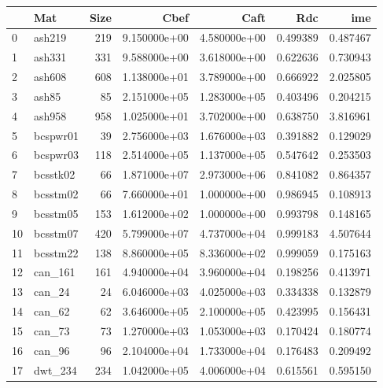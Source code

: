 \begin{tabular}{llrrrrr}
\toprule
{} &                 Mat &  Size &          Cbef &          Caft &       Rdc &        ime \\
\midrule
0  &              ash219 &   219 &  9.150000e+00 &  4.580000e+00 &  0.499389 &   0.487467 \\
1  &              ash331 &   331 &  9.588000e+00 &  3.618000e+00 &  0.622636 &   0.730943 \\
2  &              ash608 &   608 &  1.138000e+01 &  3.789000e+00 &  0.666922 &   2.025805 \\
3  &               ash85 &    85 &  2.151000e+05 &  1.283000e+05 &  0.403496 &   0.204215 \\
4  &              ash958 &   958 &  1.025000e+01 &  3.702000e+00 &  0.638750 &   3.816961 \\
5  &            bcspwr01 &    39 &  2.756000e+03 &  1.676000e+03 &  0.391882 &   0.129029 \\
6  &            bcspwr03 &   118 &  2.514000e+05 &  1.137000e+05 &  0.547642 &   0.253503 \\
7  &            bcsstk02 &    66 &  1.871000e+07 &  2.973000e+06 &  0.841082 &   0.864357 \\
8  &            bcsstm02 &    66 &  7.660000e+01 &  1.000000e+00 &  0.986945 &   0.108913 \\
9  &            bcsstm05 &   153 &  1.612000e+02 &  1.000000e+00 &  0.993798 &   0.148165 \\
10 &            bcsstm07 &   420 &  5.799000e+07 &  4.737000e+04 &  0.999183 &   4.507644 \\
11 &            bcsstm22 &   138 &  8.860000e+05 &  8.336000e+02 &  0.999059 &   0.175163 \\
12 &             can\_161 &   161 &  4.940000e+04 &  3.960000e+04 &  0.198256 &   0.413971 \\
13 &              can\_24 &    24 &  6.046000e+03 &  4.025000e+03 &  0.334338 &   0.132879 \\
14 &              can\_62 &    62 &  3.646000e+05 &  2.100000e+05 &  0.423995 &   0.156431 \\
15 &              can\_73 &    73 &  1.270000e+03 &  1.053000e+03 &  0.170424 &   0.180774 \\
16 &              can\_96 &    96 &  2.104000e+04 &  1.733000e+04 &  0.176483 &   0.209492 \\
17 &             dwt\_234 &   234 &  1.042000e+05 &  4.006000e+04 &  0.615561 &   0.595150 \\

\end{tabular}
